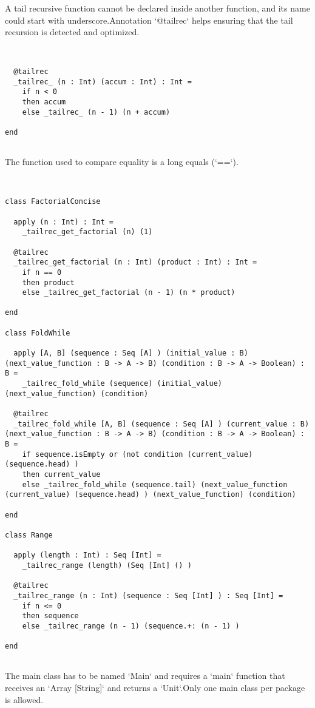 \documentclass[12pt,a4paper]{article}
\begin{document}
A tail recursive function cannot be declared inside another function, and its name could start with underscore.Annotation `@tailrec` helps ensuring that the tail recursion is detected and optimized. 


\begin{lstlisting}


  @tailrec
  _tailrec_ (n : Int) (accum : Int) : Int =
    if n < 0
    then accum
    else _tailrec_ (n - 1) (n + accum)

end


\end{lstlisting}

The function used to compare equality is a long equals (`==`). 


\begin{lstlisting}


class FactorialConcise

  apply (n : Int) : Int =
    _tailrec_get_factorial (n) (1)

  @tailrec
  _tailrec_get_factorial (n : Int) (product : Int) : Int =
    if n == 0
    then product
    else _tailrec_get_factorial (n - 1) (n * product)

end

class FoldWhile

  apply [A, B] (sequence : Seq [A] ) (initial_value : B) (next_value_function : B -> A -> B) (condition : B -> A -> Boolean) : B =
    _tailrec_fold_while (sequence) (initial_value) (next_value_function) (condition)

  @tailrec
  _tailrec_fold_while [A, B] (sequence : Seq [A] ) (current_value : B) (next_value_function : B -> A -> B) (condition : B -> A -> Boolean) : B =
    if sequence.isEmpty or (not condition (current_value) (sequence.head) )
    then current_value
    else _tailrec_fold_while (sequence.tail) (next_value_function (current_value) (sequence.head) ) (next_value_function) (condition)

end

class Range

  apply (length : Int) : Seq [Int] =
    _tailrec_range (length) (Seq [Int] () )

  @tailrec
  _tailrec_range (n : Int) (sequence : Seq [Int] ) : Seq [Int] =
    if n <= 0
    then sequence
    else _tailrec_range (n - 1) (sequence.+: (n - 1) )

end


\end{lstlisting}

The main class has to be named `Main` and requires a `main` function that receives an `Array [String]` and returns a `Unit`.Only one main class per package is allowed. 
\end{document}
